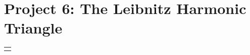 \documentclass[10pt,]{book}
\theoremstyle{plain}
\theoremstyle{definition}
\theoremstyle{definition}
\numberwithin{equation}{chapter}
\newlength{\panelmax}
\begin{document}
\section[{Project 6: The Leibnitz Harmonic Triangle}]{Project 6: The Leibnitz Harmonic Triangle}\label{exercises-10}
{%
\setlength{\panelmax}{0pt}
\ifdefined\panelboxAtabular\else\newsavebox{\panelboxAtabular}\fi%
\ifdefined\phAtabular\else\newlength{\phAtabular}\fi%
\setlength{\phAtabular}{\ht\panelboxAtabular+\dp\panelboxAtabular}
\settototalheight{\phAtabular}{\usebox{\panelboxAtabular}}
\setlength{\panelmax}{\maxof{\panelmax}{\phAtabular}}
\leavevmode%
\setlength{\tabcolsep}{0\linewidth}
\par\medskip\noindent
\begin{tabular}{@{}*{1}{c}@{}}
\begin{minipage}[c][\panelmax][t]{1\linewidth}\usebox{\panelboxAtabular}\end{minipage}\end{tabular}\\
}%
\end{document}
